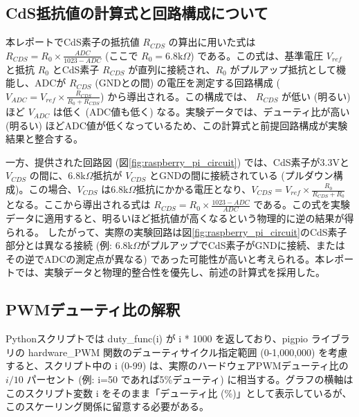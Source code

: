 \documentclass[a4paper,11pt,dvipdfmx]{jsarticle}
\begin{document}
\subsection{CdS抵抗値の計算式と回路構成について}
本レポートでCdS素子の抵抗値 $R_{CDS}$ の算出に用いた式は $R_{CDS} = R_0 \times \frac{ADC}{1023 - ADC}$ (ここで $R_0 = 6.8\text{k}\Omega$) である。この式は、基準電圧 $V_{ref}$ と抵抗 $R_0$ とCdS素子 $R_{CDS}$ が直列に接続され、$R_0$ がプルアップ抵抗として機能し、ADCが $R_{CDS}$ (GNDとの間) の電圧を測定する回路構成 ($V_{ADC} = V_{ref} \times \frac{R_{CDS}}{R_0 + R_{CDS}}$) から導出される。この構成では、 $R_{CDS}$ が低い (明るい) ほど $V_{ADC}$ は低く (ADC値も低く) なる。実験データでは、デューティ比が高い (明るい) ほどADC値が低くなっているため、この計算式と前提回路構成が実験結果と整合する。

一方、提供された回路図 (図\ref{fig:raspberry_pi_circuit}) では、CdS素子が3.3Vと $V_{CDS}$ の間に、6.8k$\Omega$抵抗が $V_{CDS}$ とGNDの間に接続されている (プルダウン構成)。この場合、$V_{CDS}$ は6.8k$\Omega$抵抗にかかる電圧となり、$V_{CDS} = V_{ref} \times \frac{R_0}{R_{CDS} + R_0}$ となる。ここから導出される式は $R_{CDS} = R_0 \times \frac{1023 - ADC}{ADC}$ である。この式を実験データに適用すると、明るいほど抵抗値が高くなるという物理的に逆の結果が得られる。
したがって、実際の実験回路は図\ref{fig:raspberry_pi_circuit}のCdS素子部分とは異なる接続 (例: 6.8k$\Omega$がプルアップでCdS素子がGNDに接続、またはその逆でADCの測定点が異なる) であった可能性が高いと考えられる。本レポートでは、実験データと物理的整合性を優先し、前述の計算式を採用した。

\subsection{PWMデューティ比の解釈}
Pythonスクリプトでは duty\_func(i) が i * 1000 を返しており、pigpio ライブラリの hardware\_PWM 関数のデューティサイクル指定範囲 (0-1,000,000) を考慮すると、スクリプト中の i (0-99) は、実際のハードウェアPWMデューティ比の $i/10$ パーセント (例: i=50 であれば5\%デューティ) に相当する。グラフの横軸はこのスクリプト変数 i をそのまま「デューティ比 (\%)」として表示しているが、このスケーリング関係に留意する必要がある。
\end{document}
